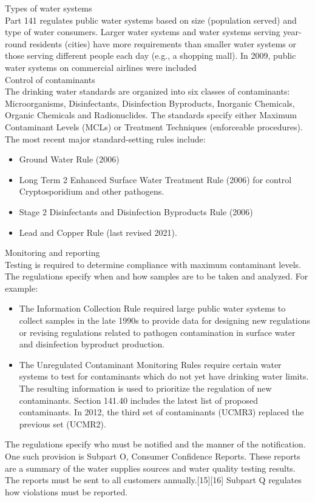Types of water systems\\
Part 141 regulates public water systems based on size (population served) and type of water consumers. Larger water systems and water systems serving year-round residents (cities) have more requirements than smaller water systems or those serving different people each day (e.g., a shopping mall). In 2009, public water systems on commercial airlines were included\\
Control of contaminants\\
The drinking water standards are organized into six classes of contaminants: Microorganisms, Disinfectants, Disinfection Byproducts, Inorganic Chemicals, Organic Chemicals and Radionuclides. The standards specify either Maximum Contaminant Levels (MCLs) or Treatment Techniques (enforceable procedures).\\ 
The most recent major standard-setting rules include:
\begin{itemize}
\item Ground Water Rule (2006)
\item Long Term 2 Enhanced Surface Water Treatment Rule (2006) for control  Cryptosporidium and other pathogens. 
\item Stage 2 Disinfectants and Disinfection Byproducts Rule (2006)
\item Lead and Copper Rule (last revised 2021).
\end{itemize}
Monitoring and reporting\\
Testing is required to determine compliance with maximum contaminant levels. The regulations specify when and how samples are to be taken and analyzed. For example:
\begin{itemize}
\item The Information Collection Rule required large public water systems to collect samples in the late 1990s to provide data for designing new regulations or revising regulations related to pathogen contamination in surface water and disinfection byproduct production.
\item The Unregulated Contaminant Monitoring Rules require certain water systems to test for contaminants which do not yet have drinking water limits. The resulting information is used to prioritize the regulation of new contaminants. Section 141.40 includes the latest list of proposed contaminants. In 2012, the third set of contaminants (UCMR3) replaced the previous set (UCMR2).\\ 
\end{itemize}
The regulations specify who must be notified and the manner of the notification. One such provision is Subpart O, Consumer Confidence Reports. These reports are a summary of the water supplies sources and water quality testing results. The reports must be sent to all customers annually.[15][16] Subpart Q regulates how violations must be reported.\\
